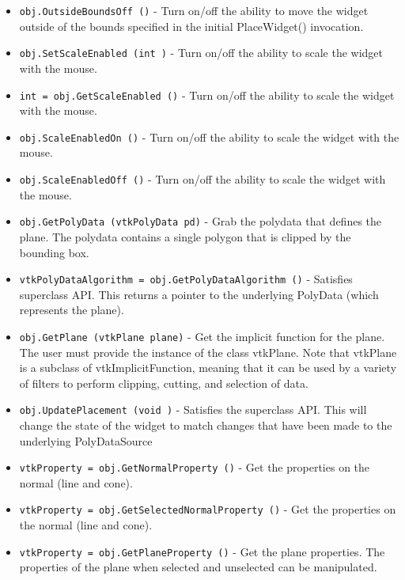 \begin{itemize}
\item  \verb|obj.OutsideBoundsOff ()| -  Turn on/off the ability to move the widget outside of the bounds
 specified in the initial PlaceWidget() invocation.

\item  \verb|obj.SetScaleEnabled (int )| -  Turn on/off the ability to scale the widget with the mouse.

\item  \verb|int = obj.GetScaleEnabled ()| -  Turn on/off the ability to scale the widget with the mouse.

\item  \verb|obj.ScaleEnabledOn ()| -  Turn on/off the ability to scale the widget with the mouse.

\item  \verb|obj.ScaleEnabledOff ()| -  Turn on/off the ability to scale the widget with the mouse.

\item  \verb|obj.GetPolyData (vtkPolyData pd)| -  Grab the polydata that defines the plane. The polydata contains a single
 polygon that is clipped by the bounding box.

\item  \verb|vtkPolyDataAlgorithm = obj.GetPolyDataAlgorithm ()| -  Satisfies superclass API.  This returns a pointer to the underlying
 PolyData (which represents the plane).

\item  \verb|obj.GetPlane (vtkPlane plane)| -  Get the implicit function for the plane. The user must provide the
 instance of the class vtkPlane. Note that vtkPlane is a subclass of
 vtkImplicitFunction, meaning that it can be used by a variety of filters
 to perform clipping, cutting, and selection of data.

\item  \verb|obj.UpdatePlacement (void )| -  Satisfies the superclass API.  This will change the state of the widget
 to match changes that have been made to the underlying PolyDataSource

\item  \verb|vtkProperty = obj.GetNormalProperty ()| -  Get the properties on the normal (line and cone).

\item  \verb|vtkProperty = obj.GetSelectedNormalProperty ()| -  Get the properties on the normal (line and cone).

\item  \verb|vtkProperty = obj.GetPlaneProperty ()| -  Get the plane properties. The properties of the plane when selected 
 and unselected can be manipulated.


\end{itemize}
